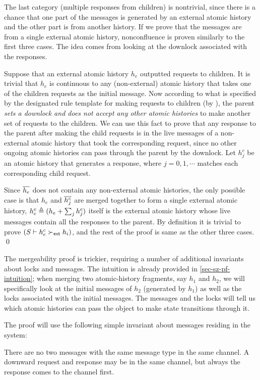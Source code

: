 The last category (multiple responses from children) is nontrivial, since there is a chance that one part of the messages is generated by an external atomic history and the other part is from another history.
If we prove that the messages are from a single external atomic history, nonconfluence is proven similarly to the first three cases.
The idea comes from looking at the downlock associated with the responses.

Suppose that an external atomic history $h_e$ outputted requests to children.
It is trivial that $h_e$ is continuous to any (non-external) atomic history that takes one of the children requests as the initial message.
Now according to what is specified by the designated rule template for making requests to children (by ), the parent \emph{sets a downlock and does not accept any other atomic histories} to make another set of requests to the children.
We can use this fact to prove that any response to the parent after making the child requests is in the live messages of a non-external atomic history that took the corresponding request, since no other ongoing atomic histories can pass through the parent by the downlock.
Let $h^c_j$ be an atomic history that generates a response, where $j=0,1,\cdots$ matches each corresponding child request.

Since $\overline{h_e}$ does not contain any non-external atomic histories, the only possible case is that $h_e$ and $\overline{h^c_j}$ are merged together to form a single external atomic history, \ie{} $h^c_e \triangleq (h_e + \sum_j h^c_j)$ itself is the external atomic history whose live messages contain all the responses to the parent.
By definition it is trivial to prove $(S \vdash h^c_e \succ_{\textsf{ext}} h_i)$, and the rest of the proof is same as the other three cases.
\renewcommand\qedsymbol{${\color{mygray}\textit{(End of the nonconfluence proof)}}\ \blacksquare$}
\qed{}
\renewcommand\qedsymbol{$\blacksquare$}

The mergeability proof is trickier, requiring a number of additional invariants about locks and messages.
The intuition is already provided in \autoref{sec-sz-pf-intuition}; when merging two atomic-history fragments, say $h_1$ and $h_2$, we will specifically look at the initial messages of $h_2$ (generated by $h_1$) as well as the locks associated with the initial messages.
The messages and the locks will tell us which atomic histories can pass the object to make state transitions through it.

The proof will use the following simple invariant about messages residing in the system:
\begin{invariant}\label{inv-same-type-msgs}
  There are no two messages with the same message type in the same channel.
  A downward request and response may be in the same channel, but always the response comes to the channel first.
\end{invariant}

